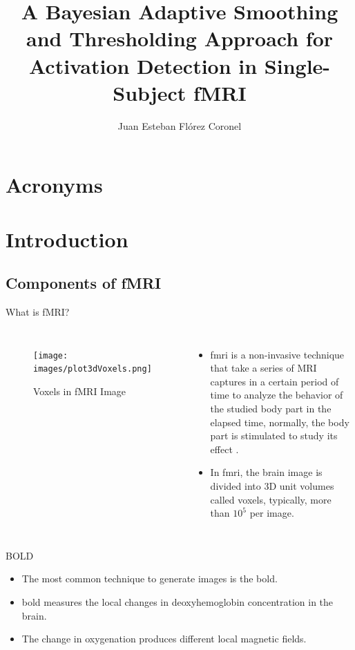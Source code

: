 \documentclass{beamer}
\title[bFAST in Single-Subject fMRI]{A Bayesian Adaptive Smoothing and 
Thresholding Approach for Activation Detection in 
Single-Subject fMRI}
\author[J. Flórez-Coronel]{Juan Esteban Flórez Coronel}
\begin{document}
\typesetFrontSlides


\section{Acronyms}

\begin{frame}
\end{frame}

\section{Introduction}

\subsection[fMRI]{Components of fMRI}

\begin{frame}{What is fMRI?}
\begin{columns}
\begin{figure}
\centering
\texttt{[image: images/plot3dVoxels.png]}
\caption{Voxels in fMRI Image}
\label{fig:fMRI}
\end{figure}
\begin{itemize}
\item \gls{fmri} is a non-invasive technique that take a series of MRI captures
in a certain period of time to analyze the behavior of the studied body part 
in the elapsed time, normally, the body part is stimulated to study its effect
 \cite{buchbinder2016functional}.
\pause
\item In \gls{fmri}, the brain image is divided into 3D unit volumes called voxels, 
typically, more than $10^5$ per image.
\end{itemize}
\end{columns}
\end{frame}

\begin{frame}{BOLD}
\begin{itemize}
\item The most common technique to generate images is the \gls{bold}.
\item \gls{bold} measures the local changes in deoxyhemoglobin 
concentration in the brain.
\item The change in oxygenation produces different local magnetic fields.
\end{itemize}
\end{frame}
\end{document}
